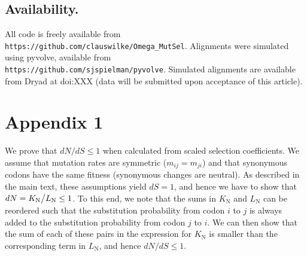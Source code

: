 \documentclass[11pt]{article}
\begin{document}
\subsection*{Availability.}
All code is freely available from \\ \texttt{https://github.com/clauswilke/Omega\_MutSel}. Alignments were simulated using pyvolve, available from  \\ \texttt{https://github.com/sjspielman/pyvolve}. Simulated alignments are available from Dryad at doi:XXX (data will be submitted upon acceptance of this article).



\section*{Appendix 1}
We prove that $dN/dS \leq 1$ when calculated from scaled selection coefficients. We assume that mutation rates are symmetric ($m_{ij} = m_{ji}$) and that synonymous codons have the same fitness (synonymous changes are neutral). As described in the main text, these assumptions yield $dS = 1$, and hence we have to show that $dN = K_\text{N}\big{/}L_\text{N} \leq 1$. To this end, we note that the sums in $K_\text{N}$ and $L_\text{N}$ can be reordered such that the substitution probability from codon $i$ to $j$ is always added to the substitution probability from codon $j$ to $i$. We can then show that the sum of each of these pairs in the expression for $K_\text{N}$ is smaller than the corresponding term in $L_\text{N}$, and hence $dN/dS \leq 1$.
\end{document}
